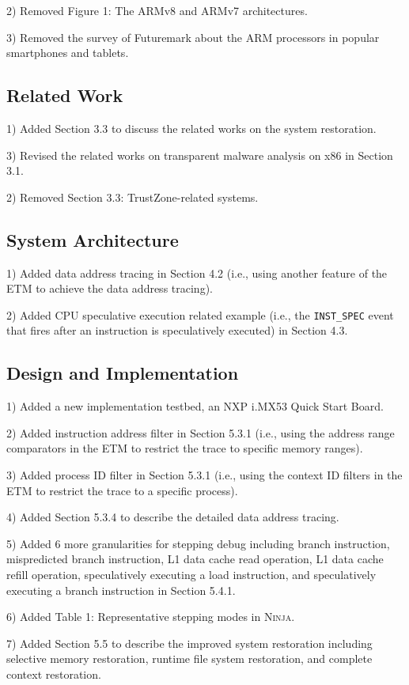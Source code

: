 \documentclass[journal,12pt,onecolumn,draftclsnofoot,]{IEEEtran}
\newcommand{\TheName}{\textsc{Ninja}}
\begin{document}
2) Removed Figure 1: The ARMv8 and ARMv7 architectures.

3) Removed the survey of Futuremark about the ARM processors in popular smartphones and tablets.

\subsection{Related Work}
1) Added Section 3.3 to discuss the related works on the system restoration.

3) Revised the related works on transparent malware analysis on x86 in Section 3.1.

2) Removed Section 3.3: TrustZone-related systems.

\subsection{System Architecture}
1) Added data address tracing in Section 4.2 (i.e., using another feature
of the ETM to achieve the data address tracing).

2) Added CPU speculative execution related example (i.e., the 
\texttt{INST\_SPEC} event that fires after an instruction is 
speculatively executed) in Section 4.3.

\subsection{Design and Implementation}
1) Added a new implementation testbed, an NXP i.MX53 Quick Start Board.

2) Added instruction address filter in Section 5.3.1 (i.e., using the
address range comparators in the ETM to restrict the trace to
specific memory ranges).

3) Added process ID filter in Section 5.3.1 (i.e., using the context
ID filters in the ETM to restrict the trace to a specific process).

4) Added Section 5.3.4 to describe the detailed data address tracing.

5) Added $6$ more granularities for
stepping debug including branch instruction,
mispredicted branch instruction, L1 data cache read operation,
L1 data cache refill operation, speculatively executing a
load instruction, and speculatively executing a branch instruction 
in Section 5.4.1.

6) Added Table 1: Representative stepping modes in \TheName{}.

7) Added Section 5.5 to describe the improved system restoration including selective memory restoration, runtime file system restoration, and complete context restoration.
\end{document}
